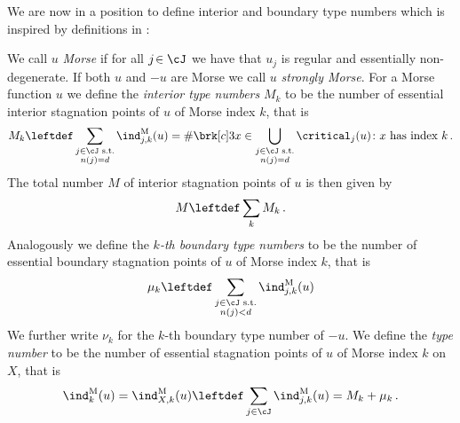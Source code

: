We are now in a position to define interior and boundary type numbers which is inspired by
definitions in \cite[Definition 10.3]{Morse1969}:
\begin{definition}
  We call $u$ \emph{Morse} if for all $j\!\in\cJ$ we have that $u_j$ is regular and essentially non-degenerate.
  If both $u$ and $-u$ are Morse we call $u$ \emph{strongly Morse}.
  For a Morse function $u$ we define 
  the \emph{interior type numbers} $M_k$ to be the number of essential interior stagnation points of $u$ of Morse index $k$, that is
  \begin{align}
    M_k\leftdef\sum_{\substack{j\in\cJ\text{ s.t.} \\ n(j)=d}}\ind^\text{M}_{j,k}(u)
    =\#\brk[c]3{x\in\bigcup_{\substack{j\in\cJ\text{ s.t.} \\ n(j)=d}}\critical_j(u)\colon x\text{ has index }k}\,.
    \label{eq:def_typenbr_interior}
  \end{align}
  The total number $M$ of interior
  stagnation points of $u$ is then given by
  \begin{align}
    M\leftdef\sum_kM_k\,.\label{eq:def_stagnationPtNbr}
  \end{align}
  Analogously we define the \emph{$k$-th boundary type numbers} to be the number of essential boundary 
  stagnation points of $u$ of Morse index $k$, that is
  \begin{align}
    \mu_k\leftdef\sum_{\substack{j\in\cJ\text{ s.t.}\\ n(j)<d}}\ind^\text{M}_{j,k}(u)\label{eq:bdTypeNbrs}
  \end{align}
  We further write $\nu_k$ for the $k$-th boundary type number of $-u$.
  We define the \emph{type number} to be the number of
  essential stagnation points of $u$ of Morse index $k$ on $X$, that is
  \begin{align}
    \ind^\text{M}_k(u)=\ind^\text{M}_{X,k}(u)\leftdef\sum_{j\in\cJ}\ind^\text{M}_{j,k}(u)=M_k+\mu_k\,.\label{eq:def_typenbr_total}
  \end{align}
\end{definition}

